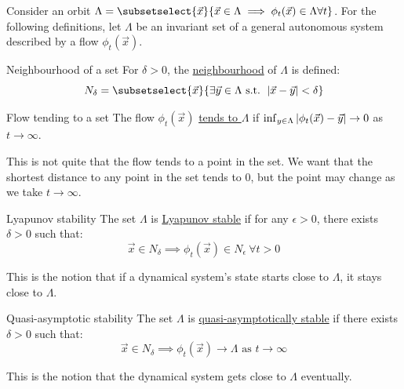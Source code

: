 \documentclass[../Main.tex]{subfiles}
\begin{document}
Consider an orbit $\Lambda = \subsetselect{\vec{x}}{\vec{x} \in \Lambda \implies \phi_t(\vec{x}) \in \Lambda \forall t}$.
For the following definitions, let $\Lambda$ be an invariant set of a general autonomous system described by a flow $\phi_t(\vec{x})$.
\begin{definition}{Neighbourhood of a set}
    For $\delta > 0$, the \underline{neighbourhood} of $\Lambda$ is defined:
    \begin{equation*}
        N_\delta = \subsetselect{\vec{x}}{\exists \vec{y} \in \Lambda \text{ s.t. } \abs{\vec{x} - \vec{y}} < \delta}
    \end{equation*}
\end{definition}
\begin{definition}{Flow tending to a set}
    The flow $\phi_t(\vec{x})$ \underline{tends to $\Lambda$} if $\inf_{y \in \Lambda}\left|\phi_t(\vec{x}) - \vec{y}\right| \to 0$ as $t \to \infty$.
\end{definition}
\begin{remark}
    This is not quite that the flow tends to a point in the set. We want that the shortest distance to any point in the set tends to $0$, but the point may change as we take $t \to \infty$.
\end{remark}
\begin{definition}{Lyapunov stability}
    The set $\Lambda$ is \underline{Lyapunov stable} if for any $\epsilon > 0$, there exists $\delta > 0$ such that:
    \begin{equation*}
        \vec{x} \in N_\delta \implies \phi_t(\vec{x}) \in N_\epsilon~\forall t > 0
    \end{equation*}
\end{definition}
\begin{remark}
    This is the notion that if a dynamical system's state starts close to $\Lambda$, it stays close to $\Lambda$.
\end{remark}
\begin{definition}{Quasi-asymptotic stability}
    The set $\Lambda$ is \underline{quasi-asymptotically stable} if there exists $\delta > 0$ such that:
    \begin{equation*}
        \vec{x} \in N_\delta \implies \phi_t(\vec{x}) \to \Lambda \text{ as } t \to \infty
    \end{equation*}
\end{definition}
\begin{remark}
    This is the notion that the dynamical system gets close to $\Lambda$ eventually.
\end{remark}
\end{document}

